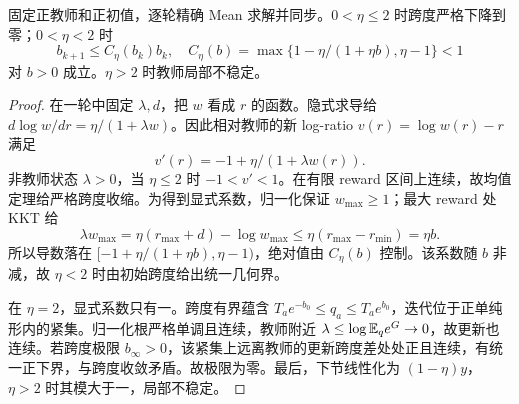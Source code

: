 \begin{theorem}
固定正教师和正初值，逐轮精确 Mean 求解并同步。$0<\eta\le2$ 时跨度严格下降到零；$0<\eta<2$ 时
\begin{equation}
b_{k+1}\le C_\eta(b_k)b_k,\quad
C_\eta(b)=\max\{1-\eta/(1+\eta b),\eta-1\}<1
\end{equation}
对 $b>0$ 成立。$\eta>2$ 时教师局部不稳定。
\end{theorem}
\begin{proof}
在一轮中固定 $\lambda,d$，把 $w$ 看成 $r$ 的函数。隐式求导给 $d\log w/dr=\eta/(1+\lambda w)$。因此相对教师的新 log-ratio $v(r)=\log w(r)-r$ 满足
\begin{equation}
v'(r)=-1+\eta/(1+\lambda w(r)).
\end{equation}
非教师状态 $\lambda>0$，当 $\eta\le2$ 时 $-1<v'<1$。在有限 reward 区间上连续，故均值定理给严格跨度收缩。为得到显式系数，归一化保证 $w_{\max}\ge1$；最大 reward 处 KKT 给
\begin{equation}
\lambda w_{\max}=\eta(r_{\max}+d)-\log w_{\max}
\le\eta(r_{\max}-r_{\min})=\eta b.
\end{equation}
所以导数落在 $[-1+\eta/(1+\eta b),\eta-1)$，绝对值由 $C_\eta(b)$ 控制。该系数随 $b$ 非减，故 $\eta<2$ 时由初始跨度给出统一几何界。

在 $\eta=2$，显式系数只有一。跨度有界蕴含 $T_ae^{-b_0}\le q_a\le T_ae^{b_0}$，迭代位于正单纯形内的紧集。归一化根严格单调且连续，教师附近 $\lambda\le\log\mathbb E_qe^G\to0$，故更新也连续。若跨度极限 $b_\infty>0$，该紧集上远离教师的更新跨度差处处正且连续，有统一正下界，与跨度收敛矛盾。故极限为零。最后，下节线性化为 $(1-\eta)y$，$\eta>2$ 时其模大于一，局部不稳定。
\end{proof}

